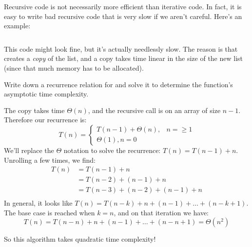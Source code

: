 \begin{prob}
    \begin{subprobset}
        \begin{subprob}
            Recursive code is not necessarily more efficient than iterative code.
            In fact, it is easy to write bad recursive code that is very slow
            if we aren't careful. Here's an example:

            \inputminted{python}{\thisdir/include/part_a.py}

            This code might look fine, but it's actually needlessly slow. The reason
            is that  creates a \emph{copy} of the list,
            and a copy takes time linear in the size of the new list (since that much
            memory has to be allocated).

            Write down a recurrence relation for  and solve it
            to determine the function's asymptotic time complexity.

            \begin{soln}
                The copy takes time $\Theta(n)$, and the recursive call is on an array
                of size $n - 1$. Therefore our recurrence is:
                \[
                    T(n)
                    =
                    \begin{cases}
                        T(n-1) + \Theta(n),& n = \geq 1\\
                        \Theta(1), n = 0 
                    \end{cases}
                \]
                We'll replace the $\Theta$ notation to solve the recurrence: $T(n) = T(n-1) + n$.
                Unrolling a few times, we find:
                \begin{align*}
                    T(n) 
        &=
        T(n-1) + n
        \\
        &=
        T(n-2) + (n - 1) + n
        \\
        &=
        T(n-3) + (n-2) + (n - 1) + n
        \\
                \end{align*}
                In general, it looks like $T(n) = T(n - k) + n + (n-1) + \ldots + (n - k + 1)$.
                The base case is reached when $k = n$, and on that iteration we have:
                \[
                    T(n) = T(n - n) + n + (n-1) + \ldots + (n - n + 1) = \Theta(n^2)
                \]

                So this algorithm takes quadratic time complexity!
            \end{soln}


\end{subprob}
\end{subprobset}
\end{prob}
